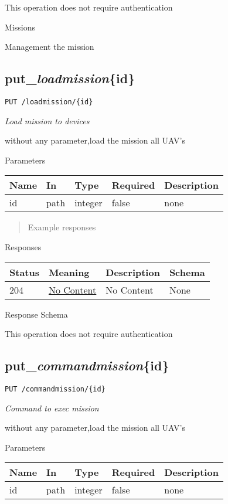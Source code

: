 \documentclass[
]{article}
\begin{document}
This operation does not require authentication

Missions

Management the mission

\hypertarget{put_loadmissionid}{%
\subsection{\texorpdfstring{put\_\emph{loadmission}\{id\}}{put\_loadmission\{id\}}}\label{put_loadmissionid}}

\texttt{PUT\ /loadmission/\{id\}}

\emph{Load mission to devices}

without any parameter,load the mission all UAV's

Parameters

\begin{longtable}[]{@{}lllll@{}}
\toprule
Name & In & Type & Required & Description\tabularnewline
\midrule
\endhead
id & path & integer & false & none\tabularnewline
\bottomrule
\end{longtable}

\begin{quote}
Example responses
\end{quote}

Responses

\begin{longtable}[]{@{}llll@{}}
\toprule
Status & Meaning & Description & Schema\tabularnewline
\midrule
\endhead
204 & \href{https://tools.ietf.org/html/rfc7231\#section-6.3.5}{No
Content} & No Content & None\tabularnewline
\bottomrule
\end{longtable}

Response Schema

This operation does not require authentication

\hypertarget{put_commandmissionid}{%
\subsection{\texorpdfstring{put\_\emph{commandmission}\{id\}}{put\_commandmission\{id\}}}\label{put_commandmissionid}}

\texttt{PUT\ /commandmission/\{id\}}

\emph{Command to exec mission}

without any parameter,load the mission all UAV's

Parameters

\begin{longtable}[]{@{}lllll@{}}
\toprule
Name & In & Type & Required & Description\tabularnewline
\midrule
\endhead
id & path & integer & false & none\tabularnewline
\bottomrule
\end{longtable}
\end{document}
